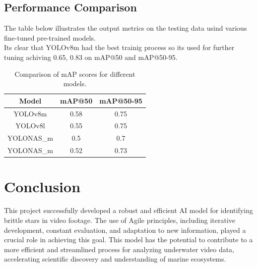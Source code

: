 \documentclass{article}
\begin{document}
\subsection{Performance Comparison}
The table below illustrates the output metrics on the testing data usind various fine-tuned pre-trained models.\\
Its clear that YOLOv8m had the best trainig process so its used for further tuning achiving 0.65, 0.83 on mAP@50 and mAP@50-95.\\
\begin{table}[htb]
    \centering
    \begin{tabular}{|c|c|c|}
        \hline
        Model & mAP@50 & mAP@50-95 \\
        \hline
        YOLOv8m & 0.58 & 0.75\\
        YOLOv8l & 0.55 & 0.75\\
        YOLONAS\_m & 0.5 & 0.7\\
        YOLONAS\_m & 0.52 & 0.73\\
        \hline
    \end{tabular}
    \caption{Comparison of mAP scores for different models.}
    \label{tab:model_comparison}
\end{table}
\section{Conclusion}

This project successfully developed a robust and efficient AI model for identifying brittle stars in video footage. The use of Agile principles, including iterative development, constant evaluation, and adaptation to new information, played a crucial role in achieving this goal. This model has the potential to contribute to a more efficient and streamlined process for analyzing underwater video data, accelerating scientific discovery and understanding of marine ecosystems.
\end{document}
